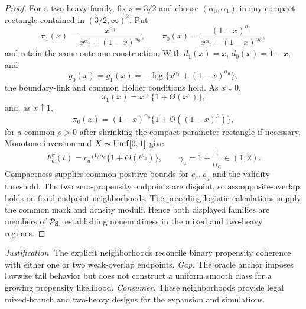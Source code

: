 \documentclass{article}
\begin{document}
\begin{proof}
For a two-heavy family, fix \(s=3/2\) and choose \((\alpha _0,\alpha _1)\) in any compact rectangle contained in \((3/2,\infty)^2\).  Put
\[
\pi _1(x)=\frac{x^{\alpha _1}}
{x^{\alpha _1}+(1-x)^{\alpha _0}},
\qquad
\pi _0(x)=\frac{(1-x)^{\alpha _0}}
{x^{\alpha _1}+(1-x)^{\alpha _0}},
\]
and retain the same outcome construction.  With \(d_1(x)=x\), \(d_0(x)=1-x\), and
\[
g_0(x)=g_1(x)
=-\log\{x^{\alpha _1}+(1-x)^{\alpha _0}\},
\]
the boundary-link and common Hölder conditions hold.  As \(x\downarrow0\),
\[
\pi _1(x)=x^{\alpha _1}\{1+O(x^{\rho})\},
\]
and, as \(x\uparrow1\),
\[
\pi _0(x)=(1-x)^{\alpha _0}\{1+O((1-x)^{\rho})\},
\]
for a common \(\rho>0\) after shrinking the compact parameter rectangle if necessary.  Monotone inversion and \(X\sim{\rm Unif}[0,1]\) give
\[
F_a^\pi(t)=c_at^{1/\alpha _a}\{1+O(t^{\rho_a})\},
\qquad
\gamma _a=1+\frac1{\alpha _a}\in(1,2).
\]
Compactness supplies common positive bounds for \(c_a,\rho_a\) and the validity threshold.  The two zero-propensity endpoints are disjoint, so \(\text{ass:opposite-overlap}\) holds on fixed endpoint neighborhoods.  The preceding logistic calculations supply the common mark and density moduli.  Hence both displayed families are members of \(\mathcal P_{\rm S}\), establishing nonemptiness in the mixed and two-heavy regimes.
\end{proof}
\par\smallskip\noindent \textit{Justification.} The explicit neighborhoods reconcile binary propensity coherence with either one or two weak-overlap endpoints. \textit{Gap.} The oracle anchor imposes lawwise tail behavior but does not construct a uniform smooth class for a growing propensity likelihood. \textit{Consumer.} These neighborhoods provide legal mixed-branch and two-heavy designs for the expansion and simulations.
\end{document}

